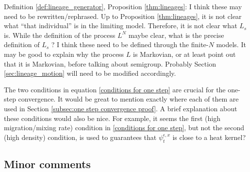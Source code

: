 
\begin{point}{}
    Definition \ref{def:lineage_generator}, Proposition \ref{thm:lineages}:
    I think these may need to be rewritten/rephrased. Up
to Proposition \ref{thm:lineages}, it is not clear what ``that individual'' is in the limiting model. Therefore,
it is not clear what $L_s$ is. While the definition of the process $L^N$ maybe clear, what is the
precise definition of $L_s$ ? I think these need to be defined through the finite-$N$ models. It may
be good to explain why the process $L$ is Markovian, or at least point out that it is Markovian,
before talking about semigroup. Probably Section \ref{sec:lineage_motion} will need to be modified accordingly.
\end{point}


\begin{point}{\revref}
The two conditions in equation \eqref{conditions for one step} are crucial for the one-step convergence.
It would be great to mention exactly where each of them are used in Section \ref{subsec:one step convergence proof}.
A brief explanation about these conditions would also be nice. For example, it seems the first (high
migration/mixing rate) condition in \eqref{conditions for one step},
but not the second (high density) condition, is used
to guarantees that $\psi_t^{\epsilon,x}$ is close to a heat kernel?
\end{point}


\subsection*{Minor comments}

